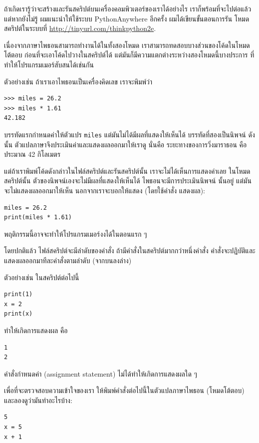 ถ้าเกิดเรารู้ว่าจะสร้างและรันสคริปต์บนเครื่องคอมพิวเตอร์ของเราได้อย่างไร เราก็พร้อมที่จะไปต่อแล้ว
แต่หากยังไม่รู้ ผมแนะนำให้ใช้ระบบ PythonAnywhere อีกครั้ง ผมได้เขียนขั้นตอนการรัน
โหมดสคริปต์ในระบบที่ \url{http://tinyurl.com/thinkpython2e}.

เนื่องจากภาษาไพธอนสามารถทำงานได้ในทั้งสองโหมด เราสามารถทดสอบบางส่วนของโค้ดในโหมดโต้ตอบ
ก่อนที่จะเอาโค้ดไปวางในสคริปต์ได้ แต่มันก็มีความแตกต่างระหว่างสองโหมดนี้บางประการ
ที่ทำให้โปรแกรมเมอร์สับสนได้เช่นกัน

ตัวอย่างเช่น ถ้าเราเอาไพธอนเป็นเครื่องคิดเลข เราจะพิมพ์ว่า

\begin{verbatim}
>>> miles = 26.2
>>> miles * 1.61
42.182
\end{verbatim}

บรรทัดแรกกำหนดค่าให้ตัวแปร {\tt miles} แต่มันไม่ได้มีผลที่แสดงให้เห็นได้
บรรทัดที่สองเป็นนิพจน์ ดังนั้น ตัวแปลภาษาจึงประเมินค่าและแสดงผลออกมาให้เราดู 
นั่นคือ ระยะทางของการวิ่งมาราธอน คือ ประมาณ 42 กิโลเมตร

แต่ถ้าเราพิมพ์โค้ดดังกล่าวในไฟล์สคริปต์และรันสคริปต์นั้น เราจะไม่ได้เห็นการแสดงค่าเลย
ในโหมดสคริปต์นั้น ตัวของนิพจน์เองจะไม่มีผลที่แสดงให้เห็นได้ ไพธอนจะมีการประเมินนิพจน์
นั้นอยู่ แต่มันจะไม่แสดงผลออกมาให้เห็น นอกจากเราจะบอกให้แสดง (โดยใช้คำสั่ง
แสดงผล): 

\begin{verbatim}
miles = 26.2
print(miles * 1.61)
\end{verbatim}

พฤติกรรมนี้อาจจะทำให้โปรแกรมเมอร์งงได้ในตอนแรก ๆ

โดยปกติแล้ว ไฟล์สคริปต์จะมีลำดับของคำสั่ง ถ้ามีคำสั่งในสคริปต์มากกว่าหนึ่งคำสั่ง 
คำสั่งจะปฏิบัติและแสดงผลออกมาทีละคำสั่งตามลำดับ (จากบนลงล่าง)

ตัวอย่างเช่น ในสคริปต์ต่อไปนี้

\begin{verbatim}
print(1)
x = 2
print(x)
\end{verbatim}
%
ทำให้เกิดการแสดงผล คือ

\begin{verbatim}
1
2
\end{verbatim}
%
คำสั่งกำหนดค่า (assignment statement) ไม่ได้ทำให้เกิดการแสดงผลใด ๆ

เพื่อที่จะตรวจสอบความเข้าใจของเรา ให้พิมพ์คำสั่งต่อไปนี้ในตัวแปลภาษาไพธอน (โหมดโต้ตอบ) 
และลองดูว่ามันทำอะไรบ้าง:

\begin{verbatim}
5
x = 5
x + 1
\end{verbatim}

